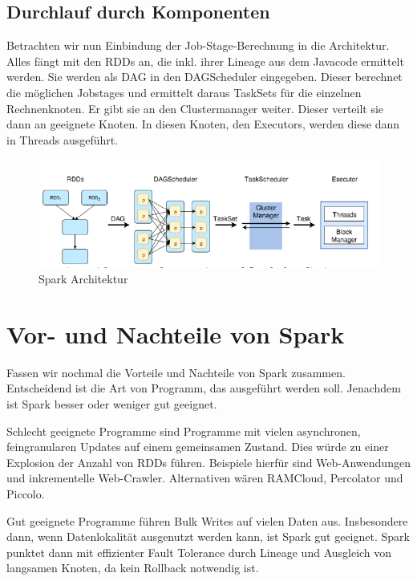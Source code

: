 \bigskip

\subsection[Durchlauf durch
Komponenten]{\rmfamily Durchlauf durch
Komponenten}
Betrachten wir nun Einbindung der Job-Stage-Berechnung in die
Architektur. Alles fängt mit den RDDs an, die inkl. ihrer Lineage aus
dem Javacode ermittelt werden. Sie werden als DAG in den DAGScheduler
eingegeben. Dieser berechnet die möglichen Jobstages und ermittelt
daraus TaskSets für die einzelnen Rechnenknoten. Er gibt sie an den
Clustermanager weiter. Dieser verteilt sie dann an geeignete Knoten. In
diesen Knoten, den Executors, werden diese dann in Threads ausgeführt. 

\begin{figure}
\centering
\includegraphics[width=\textwidth]{bilder/Seminartext-img3.png}
\caption{Spark Architektur}
\end{figure}

\bigskip

\section[Vor{}- und Nachteile von
Spark]{\rmfamily Vor- und Nachteile von Spark}
Fassen wir nochmal die Vorteile und Nachteile von Spark zusammen.
Entscheidend ist die Art von Programm, das ausgeführt werden soll.
Jenachdem ist Spark besser oder weniger gut geeignet.

Schlecht geeignete Programme sind Programme mit vielen asynchronen,
feingranularen Updates auf einem gemeinsamen Zustand. Dies würde zu
einer Explosion der Anzahl von RDDs führen. Beispiele hierfür sind
Web-Anwendungen und inkrementelle Web-Crawler. Alternativen wären
RAMCloud, Percolator und Piccolo.

Gut geeignete Programme führen Bulk Writes auf vielen Daten aus.
Insbesondere dann, wenn Datenlokalität ausgenutzt werden kann, ist
Spark gut geeignet. Spark punktet dann mit effizienter Fault Tolerance
durch Lineage und Ausgleich von langsamen Knoten, da kein Rollback
notwendig ist.

